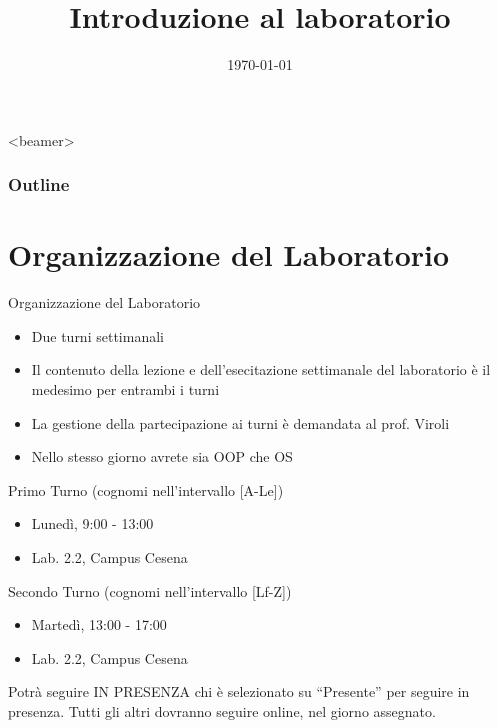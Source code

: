 \documentclass[xcolor=dvipsnames,presentation]{beamer}
\title[{\lab} -- Introduzione]{Introduzione al laboratorio}
\date[\today]{\today}
\begin{document}
\frame[label=coverpage]{\titlepage}

\begin{frame}<beamer>
	\frametitle{Outline}
	\tableofcontents[]
\end{frame}

\section{Organizzazione del Laboratorio}\label{sec:organizzazione-del-laboratorio}

\begin{frame}{Organizzazione del Laboratorio}
    \begin{itemize}
        \item Due turni settimanali
        \item Il contenuto della lezione e dell'esecitazione settimanale del laboratorio è il medesimo per entrambi i turni
        \item La gestione della partecipazione ai turni è demandata al prof. Viroli
        \item Nello stesso giorno avrete sia OOP che OS
    \end{itemize}
    \begin{block}{Primo Turno (cognomi nell'intervallo [A-Le])}
        \begin{itemize}
            \item Lunedì, 9:00 - 13:00
            \item Lab. 2.2, Campus Cesena
        \end{itemize}
    \end{block}
    \begin{block}{Secondo Turno (cognomi nell'intervallo [Lf-Z])}
        \begin{itemize}
            \item Martedì, 13:00 - 17:00
            \item Lab. 2.2, Campus Cesena
        \end{itemize}
    \end{block}
    Potrà seguire IN PRESENZA chi è selezionato su ``Presente'' per seguire in presenza. Tutti gli altri dovranno seguire online, nel giorno assegnato.
\end{frame}

\end{document}
